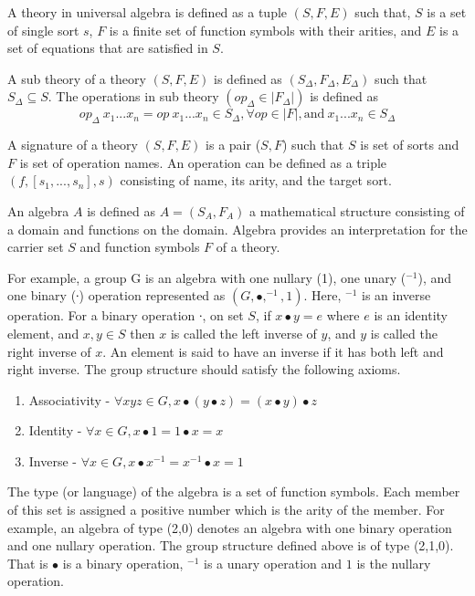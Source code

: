 A theory in universal algebra is defined as a tuple $(S,F,E)$ such that, $S$ is
a set of single sort $s$, $F$ is a finite set of function symbols with their
arities, and $E$ is a set of equations that are satisfied in $S$.

A sub theory of a theory $(S,F,E)$ is defined as $(S_\Delta,F_\Delta,E_\Delta)$
such that $S_\Delta \subseteq S$. The operations in sub theory $(op_\Delta \in
|F_\Delta|)$ is defined as
\[op_\Delta\ x_1...x_n = op\ x_1...x_n \in S_\Delta,\forall op \in
|F|,\text{and}\ x_1...x_n \in S_\Delta \]  

A signature of a theory $(S,F,E)$ is a pair ($S,F$) such that $S$ is set of
sorts and $F$ is set of operation names. An operation can be defined as a triple
$(f,[s_1,...,s_n],s)$ consisting of name, its arity, and the target sort. 

An algebra $A$ is defined as $A = (S_A,F_A)$ a mathematical structure consisting
of a domain and functions on the domain. Algebra provides an interpretation for
the carrier set $S$ and function symbols $F$ of a theory.

For example, a group G is an algebra with one nullary (1), one unary ($^{-1}$),
and one binary (∙) operation represented as $(G, ∙, ^{-1}, 1)$. Here, $^{-1}$ is
an inverse operation. For a binary operation ∙, on set $S$, if $x ∙ y = e$ where
$e$ is an identity element, and $x,y \in S$ then $x$ is called the left inverse
of $y$, and $y$ is called the right inverse of $x$. An element is said to have
an inverse if it has both left and right inverse. The group structure should
satisfy the following axioms. 
\begin{enumerate}
\item Associativity - \( ∀ x y z \in G, x ∙ (y ∙ z) = (x ∙ y) ∙ z \)
\item Identity - \(∀ x \in G, x ∙ 1 = 1 ∙ x = x\)
\item Inverse - \( ∀ x \in G, x ∙ x ^{-1} =  x
^{-1} ∙ x = 1\)
\end{enumerate}

The type (or language) of the algebra is a set of function symbols. Each member
of this set is assigned a positive number which is the arity of the member. For
example, an algebra of type (2,0) denotes an algebra with one binary operation
and one nullary operation. The group structure defined above is of type (2,1,0).
That is $∙$ is a binary operation, $^{-1}$ is a unary operation and $1$ is the
nullary operation.

